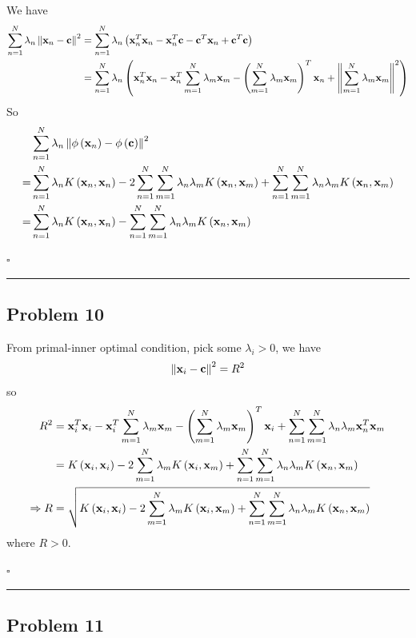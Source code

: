 \documentclass[12pt]{article}
\newcommand*{\QEDB}{\hfill\ensuremath{\square}}
\newcommand{\ParTh}[1]{\left(#1\right)}
\newcommand{\BF}[1]{{\bf#1}}
\newcommand{\VecAbsVal}[1]{\left\|#1\right\|}
\newcommand{\horrule}[1]{\rule{\linewidth}{#1}}
\begin{document}
We have
\begin{align}
\sum_{n=1}^{N}\lambda_n\VecAbsVal{\BF{x}_n-\BF{c}}^2&=\sum_{n=1}^{N}\lambda_n\ParTh{\BF{x}^T_n\BF{x}_n-\BF{x}^T_n\BF{c}-\BF{c}^T\BF{x}_n+\BF{c}^T\BF{c}}\\
&=\sum_{n=1}^{N}\lambda_n\ParTh{\BF{x}^T_n\BF{x}_n-\BF{x}^T_n\sum_{m=1}^{N}\lambda_m\BF{x}_m-\ParTh{\sum_{m=1}^{N}\lambda_m\BF{x}_m}^T\BF{x}_n+\VecAbsVal{\sum_{m=1}^{N}\lambda_m\BF{x}_m}^2}
\end{align}
So
\begin{align}
&\sum_{n=1}^{N}\lambda_n\VecAbsVal{\phi\ParTh{\BF{x}_n}-\phi\ParTh{\BF{c}}}^2\\
=&\sum_{n=1}^{N}\lambda_nK\ParTh{\BF{x}_n,\BF{x}_n}-2\sum_{n=1}^{N}\sum_{m=1}^{N}\lambda_n\lambda_mK\ParTh{\BF{x}_n,\BF{x}_m}+\sum_{n=1}^{N}\sum_{m=1}^{N}\lambda_n\lambda_mK\ParTh{\BF{x}_n,\BF{x}_m}\\
=&\sum_{n=1}^{N}\lambda_nK\ParTh{\BF{x}_n,\BF{x}_n}-\sum_{n=1}^{N}\sum_{m=1}^{N}\lambda_n\lambda_mK\ParTh{\BF{x}_n,\BF{x}_m}
\end{align}

\QEDB

\horrule{0.5pt}

\subsection*{Problem 10}

From primal-inner optimal condition, pick some $\lambda_i>0$, we have
\begin{align}
\VecAbsVal{\BF{x}_i-\BF{c}}^2=R^2
\end{align}
so
\begin{align}
R^2&=\BF{x}^T_i\BF{x}_i-\BF{x}^T_i\sum_{m=1}^{N}\lambda_m\BF{x}_m-\ParTh{\sum_{m=1}^{N}\lambda_m\BF{x}_m}^T\BF{x}_i+\sum_{n=1}^{N}\sum_{m=1}^{N}\lambda_n\lambda_m\BF{x}^T_n\BF{x}_m\\
&=K\ParTh{\BF{x}_i,\BF{x}_i}-2\sum_{m=1}^{N}\lambda_mK\ParTh{\BF{x}_i,\BF{x}_m}+\sum_{n=1}^{N}\sum_{m=1}^{N}\lambda_n\lambda_mK\ParTh{\BF{x}_n,\BF{x}_m}\\
\Rightarrow R&=\sqrt{K\ParTh{\BF{x}_i,\BF{x}_i}-2\sum_{m=1}^{N}\lambda_mK\ParTh{\BF{x}_i,\BF{x}_m}+\sum_{n=1}^{N}\sum_{m=1}^{N}\lambda_n\lambda_mK\ParTh{\BF{x}_n,\BF{x}_m}}
\end{align}
where $R>0$.

\QEDB

\horrule{0.5pt}

\subsection*{Problem 11}
\end{document}
